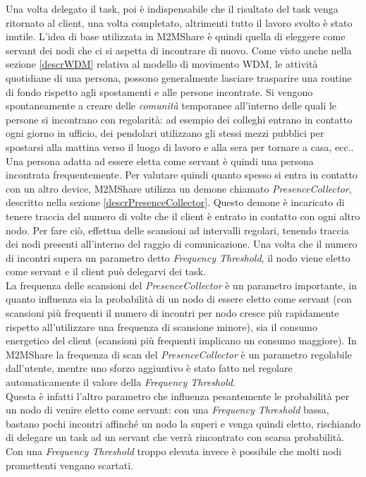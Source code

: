 Una volta delegato il task, poi è indispensabile che il risultato del task venga ritornato al client, una volta completato, altrimenti tutto il lavoro svolto è stato inutile. L'idea di base utilizzata in M2MShare è quindi quella di eleggere come servant dei nodi che ci si aspetta di incontrare di nuovo. Come visto anche nella sezione \ref{descrWDM} relativa al modello di movimento WDM, le attività quotidiane di una persona, possono generalmente lasciare trasparire una routine di fondo rispetto agli spostamenti e alle persone incontrate. Si vengono spontaneamente a creare delle \textit{comunità} temporanee all'interno delle quali le persone si incontrano con regolarità: ad esempio dei colleghi entrano in contatto ogni giorno in ufficio, dei pendolari utilizzano gli stessi mezzi pubblici per spostarsi alla mattina verso il luogo di lavoro e alla sera per tornare a casa, ecc..
\\

Una persona adatta ad essere eletta come servant è quindi una persona incontrata frequentemente. Per valutare quindi quanto spesso si entra in contatto con un altro device, M2MShare utilizza un demone chiamato \textit{PresenceCollector}, descritto nella sezione \ref{descrPresenceCollector}. Questo demone è incaricato di tenere traccia del numero di volte che il client è entrato in contatto con ogni altro nodo. Per fare ciò, effettua delle scansioni ad intervalli regolari, tenendo traccia dei nodi presenti all'interno del raggio di comunicazione. Una volta che il numero di incontri supera un parametro detto \textit{Frequency Threshold}, il nodo viene eletto come servant e il client può delegarvi dei task.
\\

La frequenza delle scansioni del \textit{PresenceCollector} è un parametro importante, in quanto influenza sia la probabilità di un nodo di essere eletto come servant (con scansioni più frequenti il numero di incontri per nodo cresce più rapidamente rispetto all'utilizzare una frequenza di scansione minore), sia il consumo energetico del client (scansioni più frequenti implicano un consumo maggiore). In M2MShare la frequenza di scan del \textit{PresenceCollector} è un parametro regolabile dall'utente, mentre uno sforzo aggiuntivo è stato fatto nel regolare automaticamente il valore della \textit{Frequency Threshold}.
\\

Questa è infatti l'altro parametro che influenza pesantemente le probabilità per un nodo di venire eletto come servant: con una \textit{Frequency Threshold} bassa, bastano pochi incontri affinché un nodo la superi e venga quindi eletto, rischiando di delegare un task ad un servant che verrà rincontrato con scarsa probabilità. Con una \textit{Frequency Threshold} troppo elevata invece è possibile che molti nodi promettenti vengano scartati.
\\


